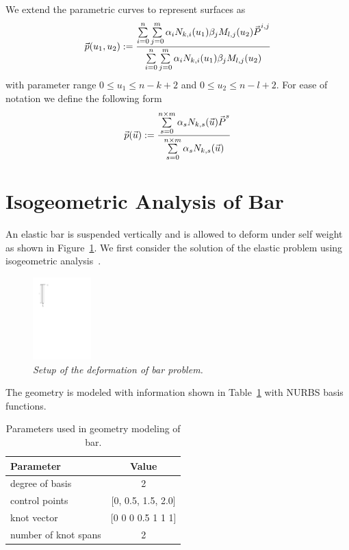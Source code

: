 \documentclass[submit,12pt]{aiaa-pretty} %
\begin{document}
We extend the parametric curves to represent surfaces as
\begin{equation}
  \vec{\mkern0mup}(u_1, u_2) := \dfrac{ {\sum\limits_{i=0}^{n} \sum\limits_{j=0}^{m} \alpha_i N_{k,i}(u_1) \beta_j M_{l,j}(u_2) \vec{\mkern0muP}^{i,j}}} {\sum\limits_{i=0}^{n} \sum\limits_{j=0}^{m} \alpha_i N_{k,i}(u_1) \beta_j M_{l,j}(u_2)}
\end{equation}
with parameter range $0 \le u_1 \le n - k + 2$ and $0 \le u_2 \le n - l + 2$. 
For ease of notation we define the following form
\begin{equation}
  \vec{\mkern0mup}(\vec{\mkern0muu}) := \dfrac{ {\sum \limits_{s=0}^{n \times m} \alpha_{s} N_{k,s}(\vec{\mkern0muu}) \vec{\mkern0muP}^{s}}} {\sum \limits_{s=0}^{n \times m} \alpha_{s} N_{k,s}(\vec{\mkern0muu})}
\end{equation}

\section{Isogeometric Analysis of Bar}
An elastic bar is suspended vertically and is allowed to deform under
self weight as shown in Figure~\ref{fig:bar-setup}. We first consider
the solution of the elastic problem using isogeometric
analysis~\cite{bar-analysis,1D_bar}.
\begin{figure}[h] 
  \centering
  \includegraphics[width=0.2\textwidth]{bar-setup.pdf} 
  \caption{\emph{Setup of the deformation of bar problem.}}
  \label{fig:bar-setup}
\end{figure}
The geometry is modeled with information shown in
Table~\ref{tab:bar-problem-parameters} with NURBS basis functions.
\begin{table}
  \centering
  \caption{Parameters used in geometry modeling of bar.}
  \label{tab:bar-problem-parameters}
  \begin{tabular}{lc}
    \hline
    Parameter & Value \\
    \hline
    degree of basis & 2 \\
    control points  &  [0, 0.5, 1.5, 2.0] \\
    knot vector     & [0 0 0 0.5 1 1 1] \\
    number of knot spans & 2 \\
    \hline
  \end{tabular}
\end{table}
\end{document}
